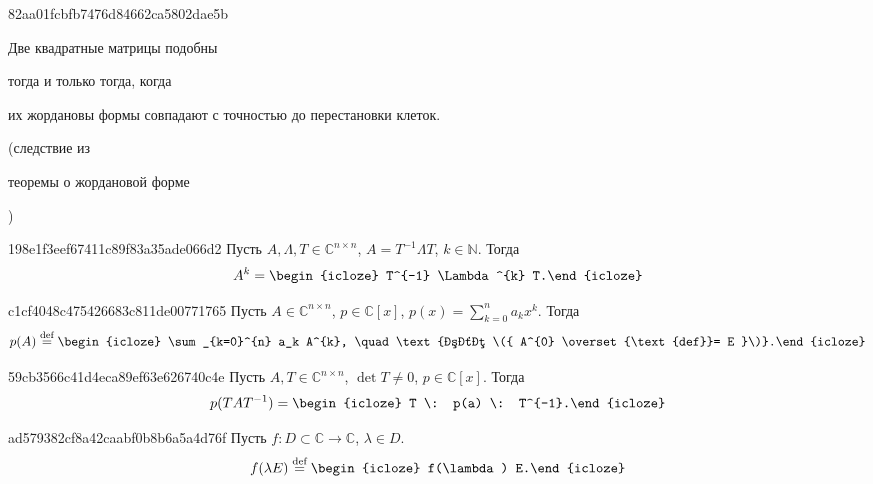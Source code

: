 \begin{note}{82aa01fcbfb7476d84662ca5802dae5b}
    \begin{icloze}{2}Две квадратные матрицы подобны\end{icloze} \begin{icloze}{3}тогда и только тогда, когда\end{icloze} \begin{icloze}{1}их жордановы формы совпадают с точностью до перестановки клеток.\end{icloze}

    \begin{center}
        \tiny (следствие из \begin{icloze}{4}теоремы о жордановой форме\end{icloze})
    \end{center}
\end{note}

\begin{note}{198e1f3eef67411c89f83a35ade066d2}
    Пусть \( A, \Lambda, T \in \mathbb C^{n \times n} \),\: \( A = T^{-1} \Lambda T \),\: \( k \in \mathbb N \). Тогда
    \[
        A^{k} = \begin{icloze}{1}T^{-1} \Lambda^{k} T.\end{icloze}
    \]
\end{note}

\begin{note}{c1cf4048c475426683c811de00771765}
    Пусть \({ A \in \mathbb C^{n \times n} }\),\: \({ p \in \mathbb C[x] }\),\: \( \displaystyle p(x) = \sum_{k=0}^{n} a_k x^{k}. \)
    Тогда
    \[
        p(A) \overset{\text{def}}= \begin{icloze}{1}\sum_{k=0}^{n} a_k A^{k}, \quad \text{где \({ A^{0} \overset{\text{def}}= E }\)}.\end{icloze}
    \]
\end{note}

\begin{note}{59cb3566c41d4eca89ef63e626740c4e}
    Пусть \({ A, T \in \mathbb C^{n \times n} }\),\: \({ \det T \neq 0 }\),\: \({ p \in \mathbb C[x] }\). Тогда
    \[
        p(T A T^{-1}) = \begin{icloze}{1}T \: p(a) \: T^{-1}.\end{icloze}
    \]
\end{note}

\begin{note}{ad579382cf8a42caabf0b8b6a5a4d76f}
    Пусть \({ f : D \subset \mathbb C \to \mathbb C }\), \({ \lambda \in D }\).
    \[
        f(\lambda E) \overset{\text{def}}= \begin{icloze}{1}f(\lambda) E.\end{icloze}
    \]
\end{note}

